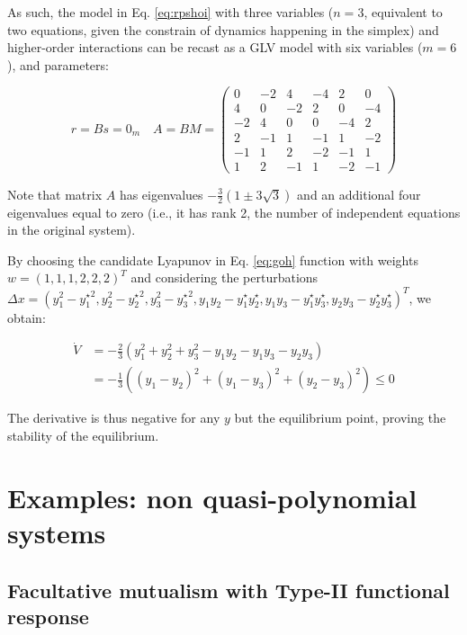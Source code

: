 \documentclass{article}
\begin{document}
As such, the model in Eq. \ref{eq:rpshoi} with three variables (\(n=3\),
equivalent to two equations, given the constrain of dynamics happening
in the simplex) and higher-order interactions can be recast as a GLV
model with six variables (\(m = 6\)), and parameters:

\begin{equation}
r = B s = 0_m
\quad
A = B M = \begin{pmatrix}
0 & -2 & 4 & -4 & 2 & 0 \\ 
4 & 0 & -2 & 2 & 0 & -4 \\ 
-2 & 4 & 0 & 0 & -4 & 2 \\ 
2 & -1 & 1 & -1 & 1 & -2 \\ 
-1 & 1 & 2 & -2 & -1 & 1 \\ 
1 & 2 & -1 & 1 & -2 & -1
\end{pmatrix}
\end{equation}

Note that matrix \(A\) has eigenvalues
\(-\frac{3}{2}(1 \pm 3 \sqrt{3})\) and an additional four eigenvalues
equal to zero (i.e., it has rank 2, the number of independent equations
in the original system).

By choosing the candidate Lyapunov in Eq. \ref{eq:goh} function with
weights \(w = (1,1,1, 2,2,2)^T\) and considering the perturbations
\(\Delta x = (y_1^2 - {y_1^\star}^2, y_2^2 - {y_2^\star}^2, y_3^2 - {y_3^\star}^2, y_1 y_2 - y_1^\star y_2^\star, y_1 y_3 - y_1^\star y_3^\star, y_2 y_3 - y_2^\star y_3^\star)^T\),
we obtain:

\begin{equation}
\begin{aligned}
\dot{V} &= -\frac{2}{3} \left(y_1^2 + y_2^2 + y_3^2 - y_1 y_2 -y_1 y_3 - y_2 y_3 \right) \\
&=-\frac{1}{3} \left((y_1 - y_2)^2 + (y_1 - y_3)^2 + (y_2 - y_3)^2\right) \leq 0
\end{aligned}
\end{equation}

The derivative is thus negative for any \(y\) but the equilibrium point,
proving the stability of the equilibrium.

\hypertarget{examples-non-quasi-polynomial-systems}{%
\section{Examples: non quasi-polynomial
systems}\label{examples-non-quasi-polynomial-systems}}

\hypertarget{facultative-mutualism-with-type-ii-functional-response}{%
\subsection{Facultative mutualism with Type-II functional
response}\label{facultative-mutualism-with-type-ii-functional-response}}
\end{document}
